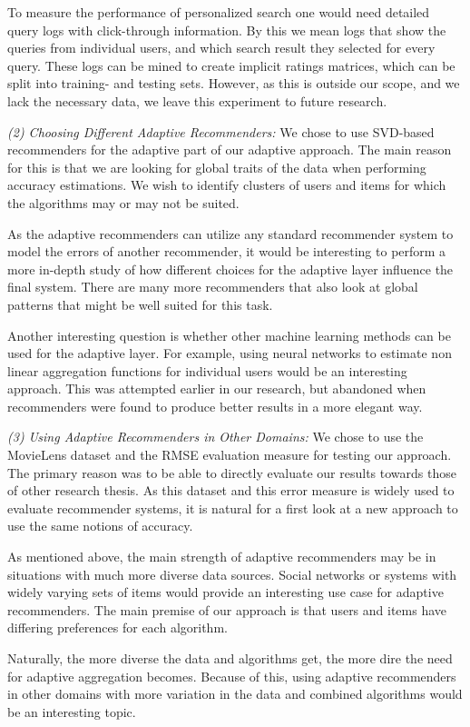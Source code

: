 To measure the performance of personalized search one would need detailed query logs with click-through information.
By this we mean logs that show the queries from individual users, and which search result they
selected for every query.
These logs can be mined to create implicit ratings matrices, which can be split into
training- and testing sets.
However, as this is outside our scope, and we lack the necessary data,
we leave this experiment to future research.


\emph{(2) Choosing Different Adaptive Recommenders:}
We chose to use SVD-based recommenders for the adaptive part of our adaptive approach.
The main reason for this is that we are looking for global traits of the data
when performing accuracy estimations. We wish to identify
clusters of users and items for which the algorithms may or may not be suited.

As the adaptive recommenders can utilize any standard recommender system
to model the errors of another recommender, it would be interesting to perform
a more in-depth study of how different choices for the adaptive layer
influence the final system.
There are many more recommenders that also look at global patterns
that might be well suited for this task.

Another interesting question is whether other machine learning methods can be used for the adaptive layer.
For example, using neural networks to estimate non linear aggregation functions for individual users would be an interesting approach.
This was attempted earlier in our research, but abandoned when recommenders were found to produce
better results in a more elegant way.


\emph{(3) Using Adaptive Recommenders in Other Domains:}
We chose to use the MovieLens dataset and the RMSE evaluation measure for testing our approach.
The primary reason was to be able to directly evaluate our results towards those of other research thesis.
As this dataset and this error measure is widely used to evaluate recommender systems,
it is natural for a first look at a new approach to use the same notions of accuracy.

As mentioned above, the main strength of adaptive recommenders may be
in situations with much more diverse data sources. Social networks or systems
with widely varying sets of items would provide an interesting use case for adaptive recommenders.
The main premise of our approach is that users and items have differing preferences
for each algorithm. 

Naturally, the more diverse the data and algorithms get,
the more dire the need for adaptive aggregation becomes.
Because of this, using adaptive recommenders in other domains with more variation 
in the data and combined algorithms would be an interesting topic.


